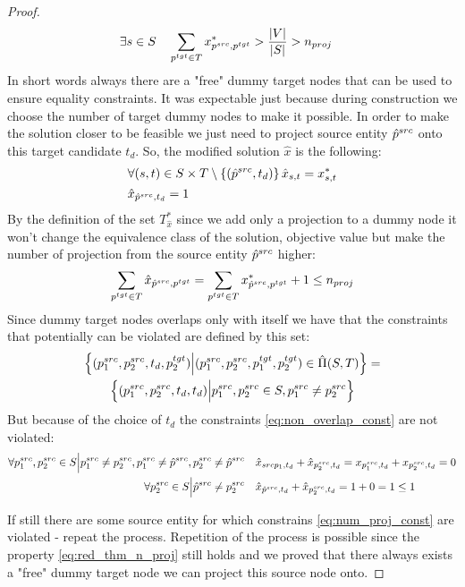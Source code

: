 \begin{proof}
\begin{align*}
    & \exists s \in S \quad
    \sum\limits_{p^{tgt} \in T} x^*_{p^{src}, p^{tgt}} > \frac{|V|}{|S|} >
    n_{proj}
  \end{align*}
  In short words always there are a "free" dummy target nodes that can be used to ensure equality constraints.
  It was expectable just because during construction we choose the number of target dummy nodes to make it possible.
  In order to make the solution closer to be feasible we just need to project source entity \( \hat{p}^{src} \) onto this target
  candidate \( t_d \). So, the modified solution \( \hat{x} \) is the following:
  \begin{align*}
    & \forall (s,t) \in S \times T \setminus \left\{ (\hat{p}^{src}, t_d) \right\} \hat{x}_{s,t} = x^*_{s,t} \\
    & \hat{x}_{\hat{p}^{src}, t_d} = 1
  \end{align*}
  By the definition of the set \( T^*_{\hat{x}} \) since we add only a projection to a dummy node
  it won't change the equivalence class of the solution, objective value but make the number of projection
  from the source entity \( \hat{p}^{src} \) higher:
  \[
    \sum\limits_{p^{tgt} \in T} \hat{x}_{\hat{p}^{src}, p^{tgt}} =
    \sum\limits_{p^{tgt} \in T} x^*_{\hat{p}^{src}, p^{tgt}} + 1
    \leq n_{proj}
  \]
  Since dummy target nodes overlaps only with itself we have that the constraints that potentially
  can be violated are defined by this set:
  \begin{multline*}
    \left\{ (p_1^{src}, p_2^{src}, t_d, p_2^{tgt}) \Big| (p_1^{src}, p_2^{src}, p_1^{tgt}, p_2^{tgt}) \in \hat{\Pi}(S, T) \right\} = \\
    \left\{ (p_1^{src}, p_2^{src}, t_d, t_d) \Big| p_1^{src}, p_2^{src} \in S, p_1^{src} \neq p_2^{src} \right\}
  \end{multline*}
  But because of the choice of \( t_d \) the constraints
  \eqref{eq:non_overlap_const} are not violated:
  \begin{align*}
    \forall p_1^{src}, p_2^{src} \in S \Big| p_1^{src} \neq p_2^{src}, p_1^{src} \neq \hat{p}^{src}, p_2^{src} \neq \hat{p}^{src} \quad
    & \hat{x}_{src{p_1}, t_d} + \hat{x}_{p_2^{src}, t_d} = x_{p_1^{src}, t_d} + x_{p_2^{src}, t_d} = 0 \\
    \forall p_2^{src} \in S \Big| \hat{p}^{src} \neq p_2^{src} \quad
    & \hat{x}_{\hat{p}^{src}, t_d} + \hat{x}_{p_2^{src}, t_d} = 1 + 0 = 1 \leq 1
  \end{align*}

  If still there are some source entity for which constrains \eqref{eq:num_proj_const} are violated - repeat the process.
  Repetition of the process is possible since the property \eqref{eq:red_thm_n_proj} still holds and
  we proved that there always exists a "free" dummy target node we can project this source node onto.


\end{proof}

